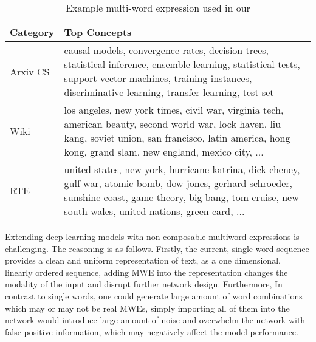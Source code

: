 
\begin{table}
\centering
\caption{Example multi-word expression used in our }\label{tab:dataset-stats}

\begin{tabular}{ll}
\toprule
\textbf{Category}  & \textbf{Top Concepts} \\
\midrule
Arxiv CS & \multicolumn{1}{p{.35\textwidth}}{\raggedright causal models, convergence rates, decision trees, statistical inference, ensemble learning, statistical tests, support vector machines, training instances, discriminative learning, transfer learning, test set
} \\
\midrule
Wiki & \multicolumn{1}{p{.35\textwidth}}{\raggedright los angeles, new york times, civil war, virginia tech, american beauty, second world war, lock haven, liu kang, soviet union, san francisco, latin america, hong kong, grand slam, new england, mexico city, ...
}  \\
\bottomrule
RTE & \multicolumn{1}{p{.35\textwidth}}{\raggedright united states, new york, hurricane katrina, dick cheney, gulf war, atomic bomb, dow jones, gerhard schroeder, sunshine coast, game theory, big bang, tom cruise, new south wales, united nations, green card, ...
}  \\
\bottomrule
\end{tabular}
\label{tab-examplar}
\end{table}


Extending deep learning models with non-composable multiword expressions is challenging.
The reasoning is as follows.
Firstly, 
the current, single word sequence provides a clean and uniform representation of text, as a 
one dimensional, linearly ordered sequence, 
adding MWE into the representation changes the modality of the input and disrupt 
further network design.
Furthermore, 
In contrast to single words, 
 one could generate large amount of word combinations which may or may not be real MWEs, 
simply importing all of them into the network would introduce large amount of noise and overwhelm the network with false positive  information,
which may negatively affect the model performance.


